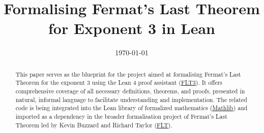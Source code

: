 \documentclass[11pt,a4paper]{report}
\title{\textbf{Formalising Fermat's Last Theorem for Exponent 3 in Lean}}
\date{\today}
\begin{document}
\maketitle

\begin{abstract}
    This paper serves as the blueprint for the project aimed at formalising Fermat’s Last Theorem
    for the exponent 3 using the Lean 4 proof assistant (\href{https://github.com/pitmonticone/FLT3}{FLT3}).
    It offers comprehensive coverage of all necessary definitions, theorems, and proofs, presented in natural,
    informal language to facilitate understanding and implementation. The related code is being integrated
    into the Lean library of formalized mathematics (\href{https://github.com/leanprover-community/mathlib4}{Mathlib})
    and imported as a dependency in the broader formalisation project of Fermat's Last Theorem led by
    Kevin Buzzard and Richard Taylor (\href{https://github.com/ImperialCollegeLondon/FLT}{FLT}).
\end{abstract}

\tableofcontents



\nocite{*}
\printbibliography[title=References]
\end{document}
